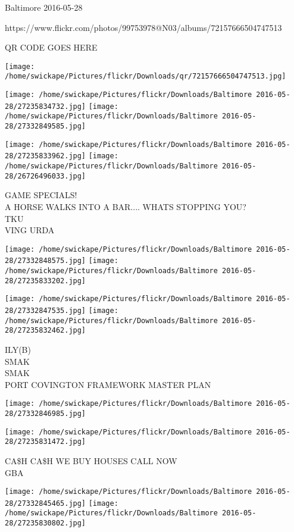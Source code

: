 \documentclass[10pt,letterpaper]{article}
\begin{document}
Baltimore 2016-05-28

https://www.flickr.com/photos/99753978@N03/albums/72157666504747513

QR CODE GOES HERE

\texttt{[image: /home/swickape/Pictures/flickr/Downloads/qr/72157666504747513.jpg]}
\pagebreak

\texttt{[image: /home/swickape/Pictures/flickr/Downloads/Baltimore 2016-05-28/27235834732.jpg]}
\texttt{[image: /home/swickape/Pictures/flickr/Downloads/Baltimore 2016-05-28/27332849585.jpg]}

\texttt{[image: /home/swickape/Pictures/flickr/Downloads/Baltimore 2016-05-28/27235833962.jpg]}
\texttt{[image: /home/swickape/Pictures/flickr/Downloads/Baltimore 2016-05-28/26726496033.jpg]}

GAME SPECIALS!\\
A HORSE WALKS INTO A BAR.... WHATS STOPPING YOU?\\
TKU\\
VING URDA\\
\pagebreak

\texttt{[image: /home/swickape/Pictures/flickr/Downloads/Baltimore 2016-05-28/27332848575.jpg]}
\texttt{[image: /home/swickape/Pictures/flickr/Downloads/Baltimore 2016-05-28/27235833202.jpg]}

\texttt{[image: /home/swickape/Pictures/flickr/Downloads/Baltimore 2016-05-28/27332847535.jpg]}
\texttt{[image: /home/swickape/Pictures/flickr/Downloads/Baltimore 2016-05-28/27235832462.jpg]}

ILY(B)\\
SMAK\\
SMAK\\
PORT COVINGTON FRAMEWORK MASTER PLAN\\
\pagebreak

\texttt{[image: /home/swickape/Pictures/flickr/Downloads/Baltimore 2016-05-28/27332846985.jpg]}

\vspace{0.25in}
\texttt{[image: /home/swickape/Pictures/flickr/Downloads/Baltimore 2016-05-28/27235831472.jpg]}

CA\$H CA\$H WE BUY HOUSES CALL NOW\\
GBA\\
\pagebreak

\texttt{[image: /home/swickape/Pictures/flickr/Downloads/Baltimore 2016-05-28/27332845465.jpg]}
\texttt{[image: /home/swickape/Pictures/flickr/Downloads/Baltimore 2016-05-28/27235830802.jpg]}
\end{document}
